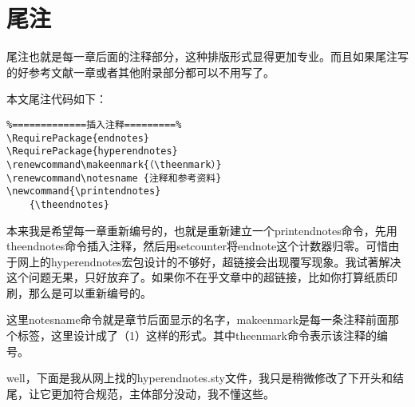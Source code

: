 \section{尾注}
尾注也就是每一章后面的注释部分，这种排版形式显得更加专业。而且如果尾注写的好参考文献一章或者其他附录部分都可以不用写了。

本文尾注代码如下：
\begin{verbatim}
%=============插入注释=========%
\RequirePackage{endnotes}
\RequirePackage{hyperendnotes}
\renewcommand\makeenmark{（\theenmark）}
\renewcommand\notesname {注释和参考资料}
\newcommand{\printendnotes}
    {\theendnotes}
\end{verbatim}
\begin{fancycolorbox}
本来我是希望每一章重新编号的，也就是重新建立一个printendnotes命令，先用theendnotes命令插入注释，然后用setcounter将endnote这个计数器归零。可惜由于网上的hyperendnotes宏包设计的不够好，超链接会出现覆写现象。我试著解决这个问题无果，只好放弃了。如果你不在乎文章中的超链接，比如你打算纸质印刷，那么是可以重新编号的。
\end{fancycolorbox}

这里notesname命令就是章节后面显示的名字，makeenmark是每一条注释前面那个标签，这里设计成了（1）这样的形式。其中theenmark命令表示该注释的编号。

well，下面是我从网上找的hyperendnotes.sty文件，我只是稍微修改了下开头和结尾，让它更加符合规范，主体部分没动，我不懂这些。

